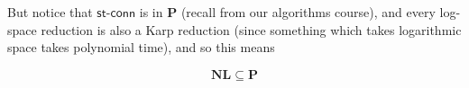 \documentclass[10pt]{article}
\def\stconn{\textsf{st-conn}}
\def\P{\mathbf{P}}
\def\NL{\mathbf{NL}}
\begin{document}
\newpage
But notice that $\stconn$ is in $\P$ (recall from our algorithms course), and every log-space reduction is also a Karp reduction (since something which takes logarithmic space takes polynomial time), and
so this means

\begin{prop*}

    \[ \NL \subseteq \P \]

\end{prop*}
\end{document}
